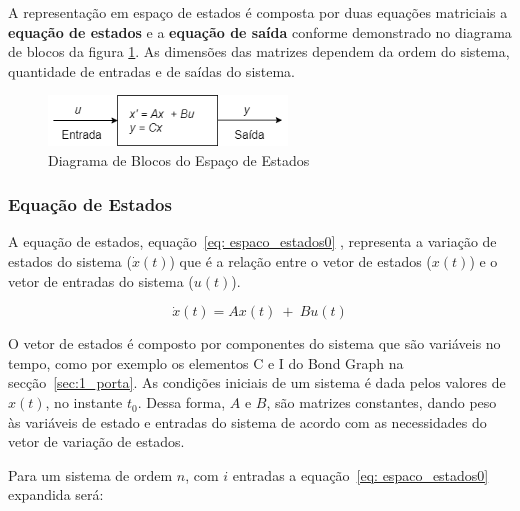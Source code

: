 A representação em espaço de estados é composta por duas equações matriciais a \textbf{equação de estados} e a \textbf{equação de saída} conforme demonstrado no diagrama de blocos da figura \ref{fig_db_estados}. As dimensões das matrizes dependem da ordem do sistema, quantidade de entradas e de saídas do sistema.


\begin{figure}[htb]
 \begin{center}
  \includegraphics[width=2.5in]{figuras/Embasamento/fig_espaco_estados.png}
   \caption{{Diagrama de Blocos do Espaço de Estados}}\label{fig_db_estados}
  \end{center}
\end{figure}

\subsubsection{Equação de Estados}

A equação de estados, equação~\ref{eq: espaco_estados0} , representa a variação de estados do sistema ($\dot{x}(t)$) que é a relação entre o vetor de estados ($x(t)$) e o vetor de entradas do sistema ($u(t)$). 

\begin{equation}\label{eq: espaco_estados0}
    \dot{x}(t) = Ax(t){~}+{~}Bu(t) 
\end{equation}

O vetor de estados é composto por componentes do sistema que são variáveis no tempo, como por exemplo os elementos C e I do Bond Graph na secção~\ref{sec:1_porta}. As condições iniciais de um sistema é dada pelos valores de $x(t)$, no instante $t_0$. Dessa forma, $A$ e $B$, são matrizes constantes, dando peso às variáveis de estado e entradas do sistema de acordo com as necessidades do vetor de variação de estados.

Para um sistema de ordem $n$, com $i$ entradas a equação~\ref{eq: espaco_estados0} expandida será:


